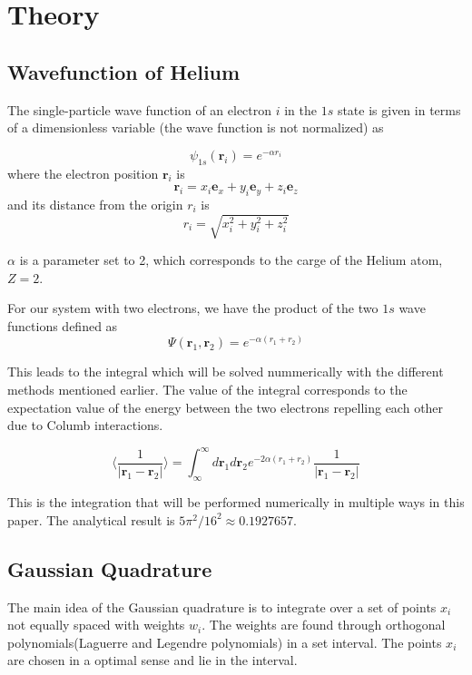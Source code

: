 \documentclass[../main.tex]{subfiles}
\begin{document}
\section{Theory} \label{sec:theory}
\subsection{Wavefunction of Helium} \label{sec:QMProb}
The single-particle wave function of an electron $i$ in the $1s$ state is given in terms of a dimensionless variable (the wave function is not normalized) as

\[\psi_{1s}(\mathbf{r}_i) = e^{-\alpha r_i}\]
where the electron position $\mathbf{r}_i$ is
\[\mathbf{r}_i = x_i \mathbf{e}_x + y_i \mathbf{e}_y + z_i \mathbf{e}_z\]
and its distance from the origin $r_i$ is
\[r_i = \sqrt{x_i^2 + y_i^2 + z_i^2}\]

$\alpha$ is a parameter set to 2, which corresponds to the carge of the Helium atom, $Z = 2$. \cite{Hjorth-Jensen2019}


For our system with two electrons, we have the product of the two $1s$ wave functions defined as
\[\Psi(\mathbf{r}_1, \mathbf{r}_2) = e^{-\alpha(r_1 + r_2)}\]

This leads to the integral which will be solved nummerically with the  different methods mentioned earlier.
The value of the integral corresponds to the expectation value of the  energy between the two electrons repelling each other due to Columb interactions.

\begin{equation}
  \langle \frac{1}{|\mathbf{r}_1 - \mathbf{r}_2|} \rangle = \int_{\infty}^\infty d\mathbf{r}_1 d\mathbf{r}_2 e^{-2\alpha(r_1 + r_2)} \frac{1}{|\mathbf{r}_1 - \mathbf{r}_2|}
  \label{eq:int-to-solve}
\end{equation}
\vspace{1cm}

This is the integration that will be performed numerically in multiple ways in this paper. The analytical result is $5\pi^2/16^2 \approx 0.1927657$.

\subsection{Gaussian Quadrature} \label{sec:GQ}
The main idea of the Gaussian quadrature is to integrate over a set of points $x_i$ not equally spaced with weights $w_i$. The weights are found through orthogonal polynomials(Laguerre and Legendre polynomials) in a set interval. The points $x_i$ are chosen in a optimal sense and lie in the interval.
\end{document}
